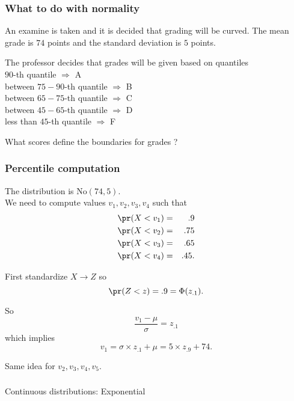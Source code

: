 \begin{frame}[fragile]\frametitle{What to do with normality}

An examine is taken and it is decided that grading will
be curved. The mean grade is $74$ points and the standard
deviation is $5$ points.  \\ 

\vspace{.1in}

The professor decides that grades will be given based on quantiles \\
$90$-th quantile $\Rightarrow$ A \\
between $75-90$-th quantile $\Rightarrow$ B \\
between $65-75$-th quantile $\Rightarrow$ C \\
between $45-65$-th quantile $\Rightarrow$ D \\
less than $45$-th quantile $\Rightarrow$ F 

\vspace{.1in}

What scores define the boundaries for grades ? 

\end{frame}


\begin{frame}[fragile]\frametitle{Percentile computation}

{\tiny 
The distribution is $\mbox{No}(74,5)$. \\ 
We need to compute values $v_1, v_2, v_3, v_4$ such that 
\begin{eqnarray*}
\pr(X < v_1) &= &.9 \\
\pr(X < v_2) &= &.75 \\
\pr(X < v_3) &= &.65\\
\pr(X < v_4) &= &.45.
\end{eqnarray*}

First standardize $X \rightarrow Z$ so 
$$\pr(Z < z) = .9 = \Phi(z_{.1}).$$ 

So  
$$\frac{v_1-\mu}{\sigma} = z_{.1}$$ 
which implies
$$v_1 =  \sigma \times z_{.1}+ \mu = 5 \times z_{.9} + 74.$$

Same idea for $v_2,v_3,v_4,v_5$.

}

\end{frame}

\begin{frame}[fragile]\frametitle{}
\begin{center}
{\Large Continuous distributions: Exponential }

\end{center}
\end{frame}




